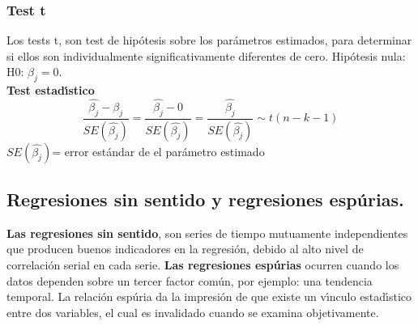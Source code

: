 
\subsubsection{\textbf{Test t}}

Los tests t, son test de hip\'otesis sobre los par\'ametros estimados, para determinar si ellos son individualmente significativamente diferentes de cero. Hip\'otesis nula: H0: $\beta_j  = 0$.\\
\vspace{5mm}
\textbf{Test estad\'\i{}stico}
\\
\begin{equation*}
\frac{\hat{\beta_j} - \beta_j}{ SE(\hat{\beta_j}) } = \frac{\hat{\beta_j} - 0}{ SE(\hat{\beta_j}) } = \frac{\hat{\beta_j}}{ SE(\hat{\beta_j}) } \sim t(n - k - 1)
\end{equation*}
\vspace{5mm}
$SE(\hat{\beta_j})$= error est\'andar de el par\'ametro estimado
\subsection{Regresiones sin sentido y regresiones esp\'urias.}

\textbf{Las regresiones sin sentido}, son series de tiempo mutuamente independientes que producen buenos indicadores en la regresi\'on, debido al alto nivel de correlaci\'on serial en cada serie.
\vspace{5mm}
\textbf{Las regresiones esp\'urias} ocurren cuando los datos dependen sobre un tercer factor com\'un, por ejemplo: una tendencia temporal. La relaci\'on esp\'uria da la impresi\'on de que existe un v\'\i{}nculo estad\'\i{}stico entre dos variables, el cual es invalidado cuando se examina objetivamente.

